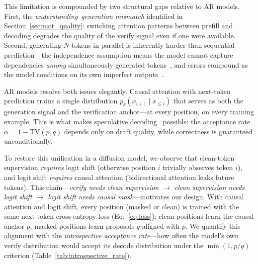 This limitation is compounded by two structural gaps relative to AR models. First, the \emph{understanding--generation mismatch} identified in Section~\ref{sec:mot_quality}: switching attention patterns between prefill and decoding degrades the quality of the verify signal even if one were available. Second, generating $N$ tokens in parallel is inherently harder than sequential prediction---the independence assumption means the model cannot capture dependencies \emph{among} simultaneously generated tokens~\citep{nie2024scalingmdlm}, and errors compound as the model conditions on its own imperfect outputs~\citep{llada21_2025}.

AR models resolve both issues elegantly. Causal attention with next-token prediction trains a single distribution $p_\theta(x_{i+1} \mid x_{\leq i})$ that serves as both the generation signal and the verification anchor---at every position, on every training example. This is what makes speculative decoding~\citep{leviathan2023speculative} possible: the acceptance rate $\alpha = 1 - \mathrm{TV}(p, q)$ depends only on draft quality, while correctness is guaranteed unconditionally.

To restore this unification in a diffusion model, we observe that clean-token supervision \emph{requires} logit shift (otherwise position $i$ trivially observes token $i$), and logit shift \emph{requires} causal attention (bidirectional attention leaks future tokens). This chain---\emph{verify needs clean supervision $\to$ clean supervision needs logit shift $\to$ logit shift needs causal mask}---motivates our design. With causal attention and logit shift, every position (masked or clean) is trained with the same next-token cross-entropy loss (Eq.~\ref{eq:loss}): clean positions learn the causal anchor $p$, masked positions learn proposals $q$ aligned with $p$. We quantify this alignment with the \emph{introspective acceptance rate}---how often the model's own verify distribution would accept its decode distribution under the $\min(1, p/q)$ criterion (Table~\ref{tab:introspective_rate}).

